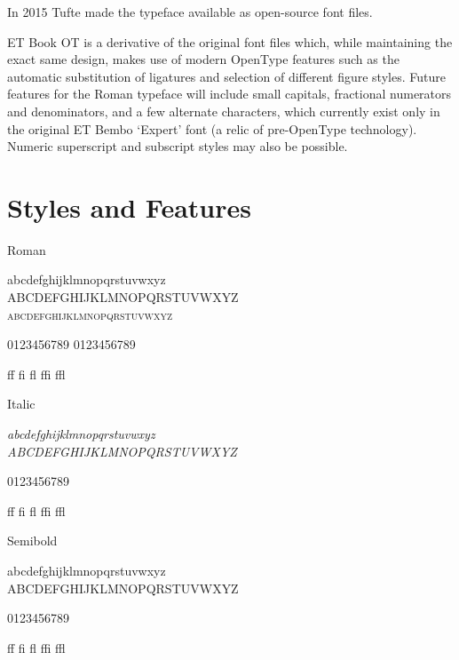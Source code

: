 \documentclass{scrartcl}
\begin{document}
In 2015 Tufte made the typeface available as open-source font files.

ET Book OT is a derivative of the original font files which, while maintaining the exact same design, makes use of modern OpenType features such as the automatic substitution of ligatures and selection of different figure styles. Future features for the Roman typeface will include small capitals, fractional numerators and denominators, and a few alternate characters, which currently exist only in the original ET Bembo `Expert' font (a relic of pre-OpenType technology). Numeric superscript and subscript styles may also be possible.

\clearpage

\section{Styles and Features}

\setlength{\parskip}{1em}
\setlength{\parindent}{0pt}

\newenvironment{style}[1]{\begin{minipage}[t]{6em}#1\end{minipage}\begin{minipage}[t]{30em}\bgroup\Large\setlength{\parskip}{0.6666em}}{\egroup\end{minipage}}

\begin{style}{Roman}
abcdefghijklmnopqrstuvwxyz \\
ABCDEFGHIJKLMNOPQRSTUVWXYZ \\
\textsc{abcdefghijklmnopqrstuvwxyz}

0123456789 \newline
{}
0123456789

ff fi fl ffi ffl
\end{style}


\begin{style}{Italic}\it
abcdefghijklmnopqrstuvwxyz \\
ABCDEFGHIJKLMNOPQRSTUVWXYZ

0123456789

ff fi fl ffi ffl
\end{style}


\begin{style}{Semibold}\semibold
abcdefghijklmnopqrstuvwxyz \\
ABCDEFGHIJKLMNOPQRSTUVWXYZ

0123456789

ff fi fl ffi ffl
\end{style}
\end{document}
